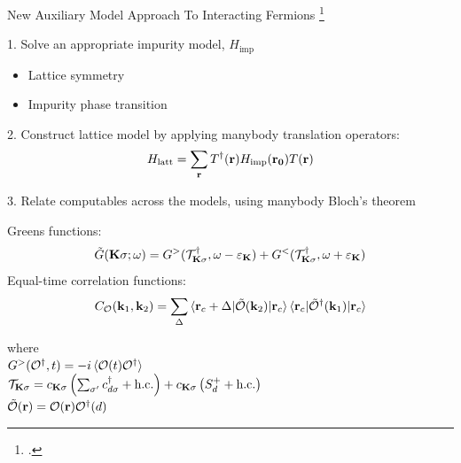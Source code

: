 \documentclass[10pt,aspectratio=169]{beamer}
\begin{document}
\begin{frame}{New Auxiliary Model Approach To Interacting Fermions}
	\footcite{stoyanova,Maier2005,Sakai2023}
	\begin{minipage}{0.4\textwidth}
		1. Solve an appropriate \alert{impurity model}, \(H_\text{imp}\)
	\begin{itemize}
		\item Lattice symmetry
		\item Impurity phase transition
	\end{itemize}
	\end{minipage}
	\hfill
	\begin{minipage}{0.48\textwidth}
		2. \alert{Construct lattice} model by applying manybody translation operators:
	\[ H_\text{latt} = \sum_{\bf r} T^\dagger({\bf r}) H_\text{imp}({\bf r_0})T({\bf r})\]
	\end{minipage}

	\vfill
	3. Relate computables across the models, using manybody Bloch's theorem\\[5pt]
	\begin{minipage}{0.55\textwidth}
	\alert{Greens functions}: \\
	\[\tilde G({\bf K}\sigma; \omega) = G^>(\mathcal{T}^\dagger_{{\bf K}\sigma}, \omega - \varepsilon_{{\bf K}}) + G^<(\mathcal{T}^\dagger_{{\bf K}\sigma}, \omega + \varepsilon_{{\bf K}})\]
	Equal-time \alert{correlation} functions:
	\[C_{\mathcal{O}}({\bf k}_1,{\bf k}_2) = \sum_{{\Delta}}\braket{{\bf r}_c + {\Delta} | \mathcal{\tilde O}({\bf k}_2) | {\bf r}_c}\braket{{\bf r}_c | \mathcal{\tilde O}^\dagger({\bf k}_1) | {\bf r}_c}\]
	\end{minipage}
	\hfill
	\begin{minipage}{0.43\textwidth}
		where \\[5pt]
		\(G^>(\mathcal{O}^\dagger, t) = -i\braket{\mathcal{O}(t)\mathcal{O}^\dagger}\)\\[5pt]
		\(\mathcal{T}_{{\bf K}\sigma} = c_{{\bf K}\sigma}\left(\sum_{\sigma^\prime}c^\dagger_{d\sigma} + \text{h.c.}\right) + c_{{\bf K}\sigma}\left(S_d^+ + \text{h.c.}\right)\)\\[5pt]
		\(\mathcal{\tilde O}({\bf r}) = \mathcal{O}({\bf r})\mathcal{O}^\dagger(d)\)
	\end{minipage}
	
	
	
\end{frame}
\end{document}
